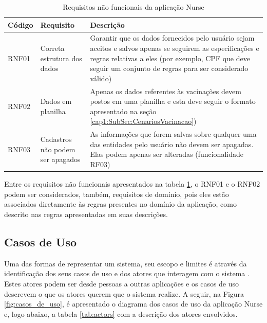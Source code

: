 \begin{table}[ht!]
  \centering
  {
  \begin{tabularx}{\textwidth}{
    | >{\centering\arraybackslash}m{} 
    | >{\centering\arraybackslash}X 
    | >{\raggedright\arraybackslash}X | }
    \hline
    \rowcolor{green!100}
    \textbf{Código} & \textbf{Requisito} & \textbf{Descrição} \\ \hline \hline
    RNF01  &  Correta estrutura dos dados              & Garantir que os dados fornecidos pelo usuário sejam aceitos e salvos apenas se seguirem as especificações e regras relativas a eles (por exemplo, CPF que deve seguir um conjunto de regras para ser considerado válido)   \\ \hline
    RNF02  &  Dados em planilha & Apenas os dados referentes às vacinações devem postos em uma planilha e esta deve seguir o formato apresentado na seção \ref{cap1:SubSec:CenariosVacinacao}) \\ \hline
    RNF03  &  Cadastros não podem ser apagados  & As informações que forem salvas sobre qualquer uma das entidades pelo usuário não devem ser apagadas. Elas podem apenas ser alteradas (funcionalidade RF03) \\ \hline
  \end{tabularx}}
\caption{Requisitos não funcionais da aplicação Nurse}
\label{tab:rnf}
\end{table}

Entre os requisitos não funcionais apresentados na tabela \ref{tab:rnf}, o RNF01 e o RNF02 podem ser considerados, também, requisitos de domínio, pois eles estão associados diretamente às regras presentes no domínio da aplicação, como descrito nas regras apresentadas em suas descrições.

\subsection{Casos de Uso}
\label{cap4:Subsec:CasosDeUso}

Uma das formas de representar um sistema, seu escopo e limites é através da identificação dos seus casos de uso e dos atores que interagem com o sistema \cite{schneider2001applying}. Estes atores podem ser desde pessoas a outras aplicações e os casos de uso descrevem o que os atores querem que o sistema realize. A seguir, na Figura \ref{fig:casos_de_uso}, é apresentado o diagrama dos casos de uso da aplicação Nurse e, logo abaixo, a tabela \ref{tab:actors} com a descrição dos atores envolvidos.

